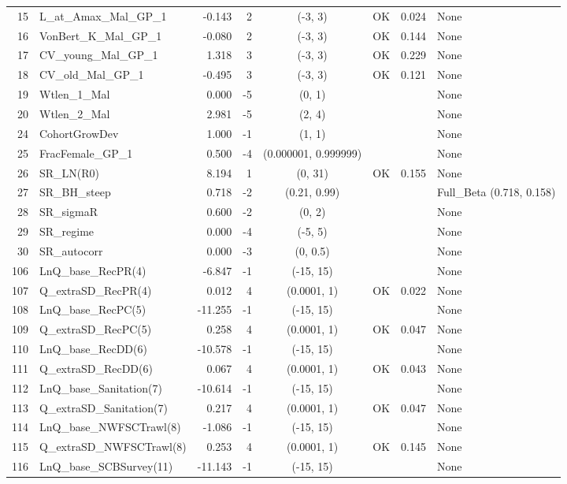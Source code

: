 \documentclass[12pt,]{article}
\begin{document}
\begin{landscape}
\begin{longtable}{rlrrcccl}
  15 & L\_at\_Amax\_Mal\_GP\_1 & -0.143 & 2 & (-3, 3) & OK & 0.024 & None \\ 
  16 & VonBert\_K\_Mal\_GP\_1 & -0.080 & 2 & (-3, 3) & OK & 0.144 & None \\ 
  17 & CV\_young\_Mal\_GP\_1 & 1.318 & 3 & (-3, 3) & OK & 0.229 & None \\ 
  18 & CV\_old\_Mal\_GP\_1 & -0.495 & 3 & (-3, 3) & OK & 0.121 & None \\ 
  19 & Wtlen\_1\_Mal & 0.000 & -5 & (0, 1) &  &  & None \\ 
  20 & Wtlen\_2\_Mal & 2.981 & -5 & (2, 4) &  &  & None \\ 
  24 & CohortGrowDev & 1.000 & -1 & (1, 1) &  &  & None \\ 
  25 & FracFemale\_GP\_1 & 0.500 & -4 & (0.000001, 0.999999) &  &  & None \\ 
  26 & SR\_LN(R0) & 8.194 & 1 & (0, 31) & OK & 0.155 & None \\ 
  27 & SR\_BH\_steep & 0.718 & -2 & (0.21, 0.99) &  &  & Full\_Beta (0.718, 0.158) \\ 
  28 & SR\_sigmaR & 0.600 & -2 & (0, 2) &  &  & None \\ 
  29 & SR\_regime & 0.000 & -4 & (-5, 5) &  &  & None \\ 
  30 & SR\_autocorr & 0.000 & -3 & (0, 0.5) &  &  & None \\ 
  106 & LnQ\_base\_RecPR(4) & -6.847 & -1 & (-15, 15) &  &  & None \\ 
  107 & Q\_extraSD\_RecPR(4) & 0.012 & 4 & (0.0001, 1) & OK & 0.022 & None \\ 
  108 & LnQ\_base\_RecPC(5) & -11.255 & -1 & (-15, 15) &  &  & None \\ 
  109 & Q\_extraSD\_RecPC(5) & 0.258 & 4 & (0.0001, 1) & OK & 0.047 & None \\ 
  110 & LnQ\_base\_RecDD(6) & -10.578 & -1 & (-15, 15) &  &  & None \\ 
  111 & Q\_extraSD\_RecDD(6) & 0.067 & 4 & (0.0001, 1) & OK & 0.043 & None \\ 
  112 & LnQ\_base\_Sanitation(7) & -10.614 & -1 & (-15, 15) &  &  & None \\ 
  113 & Q\_extraSD\_Sanitation(7) & 0.217 & 4 & (0.0001, 1) & OK & 0.047 & None \\ 
  114 & LnQ\_base\_NWFSCTrawl(8) & -1.086 & -1 & (-15, 15) &  &  & None \\ 
  115 & Q\_extraSD\_NWFSCTrawl(8) & 0.253 & 4 & (0.0001, 1) & OK & 0.145 & None \\ 
  116 & LnQ\_base\_SCBSurvey(11) & -11.143 & -1 & (-15, 15) &  &  & None \\ 

\end{longtable}
\end{landscape}
\end{document}
